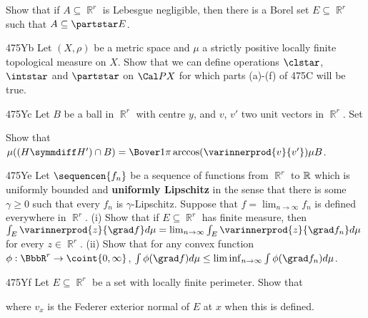 {
Show that if $A\subseteq\BbbR^r$ is Lebesgue
negligible, then there is a Borel set $E\subseteq\BbbR^r$ such that
$A\subseteq\partstar E$.

\spheader 475Yb Let $(X,\rho)$ be a metric space and $\mu$ a
strictly positive locally finite topological measure on $X$.   Show that we
can define operations $\clstar$, $\intstar$ and $\partstar$ on $\Cal PX$
for which parts (a)-(f) of 475C will be true.

\spheader 475Yc Let $B$ be a ball in $\BbbR^r$ with centre
$y$, and $v$, $v'$ two unit vectors in $\BbbR^r$.   Set


\noindent Show that $\mu((H\symmdiff H')\cap B)
=\Bover1{\pi}\arccos(\varinnerprod{v}{v'})\mu B$.


\spheader 475Ye Let $\sequencen{f_n}$ be a
sequence of functions from $\BbbR^r$ to $\Bbb R$ which is uniformly
bounded and {\bf uniformly Lipschitz}
in the sense that there is some $\gamma\ge 0$
such that every $f_n$ is $\gamma$-Lipschitz.   Suppose that
$f=\lim_{n\to\infty}f_n$ is defined everywhere in $\BbbR^r$.   (i) Show
that if $E\subseteq\BbbR^r$ has finite measure, then
$\int_E\varinnerprod{z}{\grad f}d\mu
=\lim_{n\to\infty}\int_E\varinnerprod{z}{\grad f_n}d\mu$ for every
$z\in\BbbR^r$.      
(ii) Show that
for any convex function $\phi:\BbbR^r\to\coint{0,\infty}$,
$\int\phi(\grad f)d\mu\le\liminf_{n\to\infty}\int\phi(\grad f_n)d\mu$.

\spheader 475Yf Let $E\subseteq\BbbR^r$ be a set with locally
finite perimeter.   Show that


\noindent where $v_x$ is the Federer exterior normal of $E$ at $x$ when
this is defined.

}
